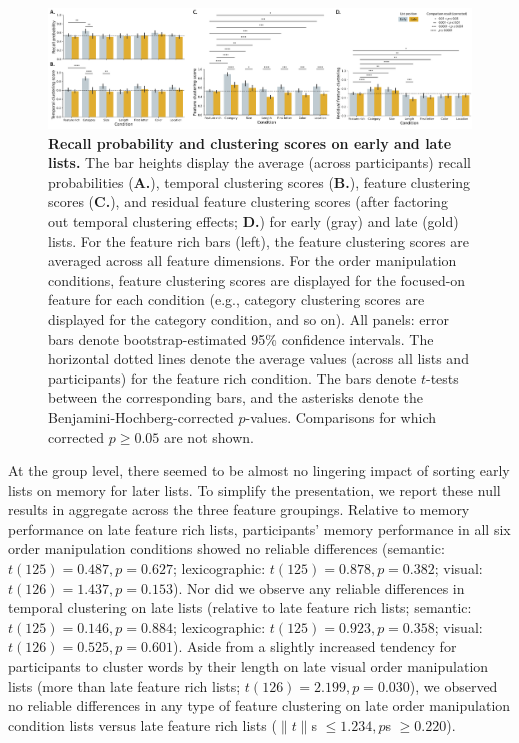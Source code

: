 \documentclass[11pt]{article}
\begin{document}
\begin{figure}
    
    \centering
    \includegraphics[width=\textwidth]{figures/memory_perf_barchart_compare}
    
\caption{\textbf{Recall probability and clustering scores on early and late
lists.} The bar heights display the average (across participants) recall
probabilities (\textbf{A.}), temporal clustering scores (\textbf{B.}), feature
clustering scores (\textbf{C.}), and residual feature clustering scores (after
factoring out temporal clustering effects; \textbf{D.}) for early (gray) and
late (gold) lists. For the feature rich bars (left), the feature clustering
scores are averaged across all feature dimensions. For the order manipulation
conditions, feature clustering scores are displayed for the focused-on feature
for each condition (e.g., category clustering scores are displayed for the
category condition, and so on). All panels: error bars denote
bootstrap-estimated 95\% confidence intervals. The horizontal dotted lines
denote the average values (across all lists and participants) for the feature
rich condition. The bars denote $t$-tests between the corresponding bars, and
the asterisks denote the Benjamini-Hochberg-corrected $p$-values. Comparisons
for which corrected $p \geq 0.05$ are not shown.} \label{fig:barplots}

\end{figure}

At the group level, there seemed to be almost no lingering impact of sorting
early lists on memory for later lists. To simplify the presentation, we report
these null results in aggregate across the three feature groupings. Relative to
memory performance on late feature rich lists, participants' memory performance
in all six order manipulation conditions showed no reliable differences
(semantic: $t(125) = 0.487, p = 0.627$; lexicographic: $t(125) = 0.878, p =
0.382$; visual: $t(126) = 1.437, p = 0.153$). Nor did we observe any reliable
differences in temporal clustering on late lists (relative to late feature rich
lists; semantic: $t(125) = 0.146, p = 0.884$; lexicographic: $t(125) = 0.923, p
= 0.358$; visual: $t(126) = 0.525, p = 0.601$). Aside from a slightly increased
tendency for participants to cluster words by their length on late visual order
manipulation lists (more than late feature rich lists; $t(126) = 2.199, p =
0.030$), we observed no reliable differences in any type of feature clustering
on late order manipulation condition lists versus late feature rich lists
($\|t\|$s $\leq 1.234, p$s $\geq 0.220$).
\end{document}

